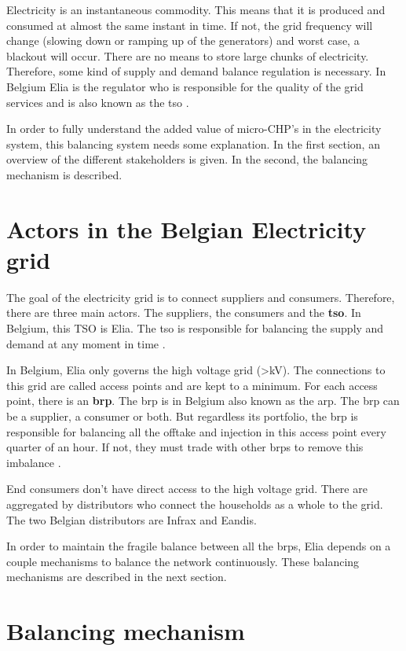 Electricity is an instantaneous commodity. This means that it is produced and consumed at almost the same instant in time. If not, the grid frequency will change (slowing down or ramping up of the generators) and worst case, a blackout will occur. There are no means to store large chunks of electricity. Therefore, some kind of supply and demand balance regulation is necessary. In Belgium Elia is the regulator who is responsible for the quality of the grid services and is also known as the \acrfull{tso} \cite{Vehvilainen2002,EliaRO}.

In order to fully understand the added value of micro-CHP's in the electricity system, this balancing system needs some explanation. In the first section, an overview of the different stakeholders is given. In the second, the balancing mechanism is described.

\section{Actors in the Belgian Electricity grid}
\label{s:gridactors}

The goal of the electricity grid is to connect suppliers and consumers. Therefore, there are three main actors. The suppliers, the consumers and the \textbf{\gls{tso}}. In Belgium, this TSO is Elia. The \gls{tso} is responsible for balancing the supply and demand at any moment in time \cite{EliaRO}.

In Belgium, Elia only governs the high voltage grid (>\unit[70]{kV}). The connections to this grid are called access points and are kept to a minimum. For each access point, there is an \textbf{\gls{brp}}. The \gls{brp} is in Belgium also known as the \gls{arp}. The \gls{brp} can be a supplier, a consumer or both. But regardless its portfolio, the \gls{brp} is responsible for balancing all the offtake and injection in this access point every quarter of an hour. If not, they must trade with other \glspl{brp} to remove this imbalance \cite{EliaRO}. 

End consumers don't have direct access to the high voltage grid. There are aggregated by distributors who connect the households as a whole to the grid. The two Belgian distributors are Infrax and Eandis.

In order to maintain the fragile balance between all the \glspl{brp}, Elia depends on a couple mechanisms to balance the network continuously. These balancing mechanisms are described in the next section.

\section{Balancing mechanism}

